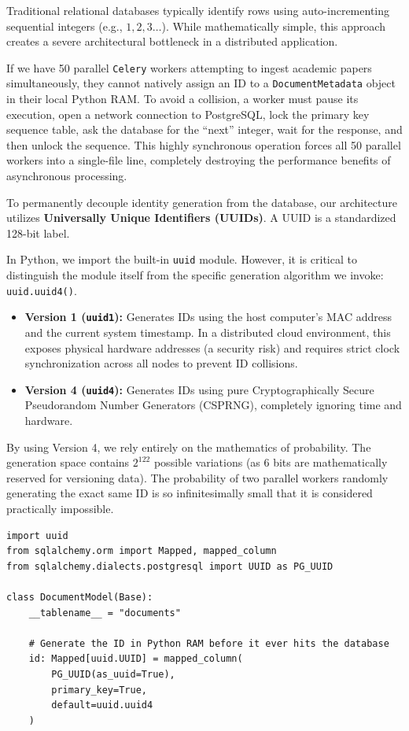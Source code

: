 Traditional relational databases typically identify rows using auto-incrementing sequential integers (e.g., $1, 2, 3\dots$). While mathematically simple, this approach creates a severe architectural bottleneck in a distributed application.

If we have 50 parallel \texttt{Celery} workers attempting to ingest academic papers simultaneously, they cannot natively assign an ID to a \texttt{DocumentMetadata} object in their local Python RAM. To avoid a collision, a worker must pause its execution, open a network connection to PostgreSQL, lock the primary key sequence table, ask the database for the ``next'' integer, wait for the response, and then unlock the sequence. This highly synchronous operation forces all 50 parallel workers into a single-file line, completely destroying the performance benefits of asynchronous processing.

To permanently decouple identity generation from the database, our architecture utilizes \textbf{Universally Unique Identifiers (UUIDs)}. A UUID is a standardized 128-bit label.

In Python, we import the built-in \texttt{uuid} module. However, it is critical to distinguish the module itself from the specific generation algorithm we invoke: \texttt{uuid.uuid4()}.
\begin{itemize}
    \item \textbf{Version 1 (\texttt{uuid1}):} Generates IDs using the host computer's MAC address and the current system timestamp. In a distributed cloud environment, this exposes physical hardware addresses (a security risk) and requires strict clock synchronization across all nodes to prevent ID collisions.
    \item \textbf{Version 4 (\texttt{uuid4}):} Generates IDs using pure Cryptographically Secure Pseudorandom Number Generators (CSPRNG), completely ignoring time and hardware.
\end{itemize}

By using Version 4, we rely entirely on the mathematics of probability. The generation space contains $2^{122}$ possible variations (as 6 bits are mathematically reserved for versioning data). The probability of two parallel workers randomly generating the exact same ID is so infinitesimally small that it is considered practically impossible.

\begin{lstlisting}[caption={Lock-Free Primary Key Generation}]
import uuid
from sqlalchemy.orm import Mapped, mapped_column
from sqlalchemy.dialects.postgresql import UUID as PG_UUID

class DocumentModel(Base):
    __tablename__ = "documents"

    # Generate the ID in Python RAM before it ever hits the database
    id: Mapped[uuid.UUID] = mapped_column(
        PG_UUID(as_uuid=True),
        primary_key=True,
        default=uuid.uuid4
    )
\end{lstlisting}



